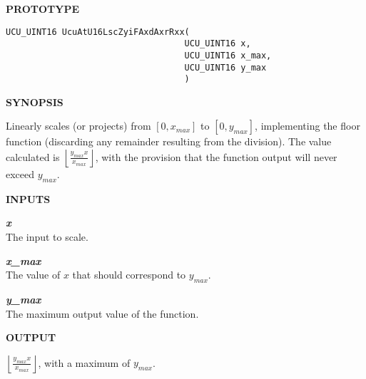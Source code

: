 %

\noindent\textbf{PROTOTYPE}
\begin {list}{}{\setlength{\leftmargin}{0.25in}\setlength{\topsep}{0.0in}}
\item
\begin{verbatim}
UCU_UINT16 UcuAtU16LscZyiFAxdAxrRxx(
                                   UCU_UINT16 x, 
                                   UCU_UINT16 x_max, 
                                   UCU_UINT16 y_max
                                   )
\end{verbatim}
\end{list}
\vspace{2.8ex}

\noindent\textbf{SYNOPSIS}
\begin{list}{}{\setlength{\leftmargin}{0.25in}\setlength{\topsep}{0.0in}}
\item Linearly scales (or projects) from $[0, x_{max}]$ to $[0, y_{max}]$,
      implementing the floor function (discarding any remainder resulting
      from the division).  The value calculated is
      $\displaystyle{\left\lfloor \frac{y_{max} x}{x_{max}} \right\rfloor}$,
      with the provision that the function output will never
      exceed $y_{max}$.

\end{list}
\vspace{2.8ex}

\noindent\textbf{INPUTS}
\begin{list}{}{\setlength{\leftmargin}{0.5in}\setlength{\itemindent}{-0.25in}\setlength{\topsep}{0.0in}\setlength{\partopsep}{0.0in}}
\item \emph{\textbf{x}}\\
      The input to scale.
\item \emph{\textbf{x\_max}}\\
      The value of $x$ that should correspond to $y_{max}$.
\item \emph{\textbf{y\_max}}\\
      The maximum output value of the function.
\end{list}
\vspace{2.8ex}

\noindent\textbf{OUTPUT}
\begin{list}{}{\setlength{\leftmargin}{0.25in}\setlength{\topsep}{0.0in}}
\item $\displaystyle{\left\lfloor \frac{y_{max} x}{x_{max}} \right\rfloor}$, with
      a maximum of $y_{max}$.
\end{list}
\vspace{2.8ex}

